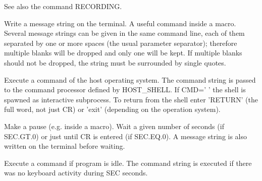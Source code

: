    \par
See also the command RECORDING.  

\ENDCMD


\BEGARG
{}
\ENDARG

   \par
Write a message string on the terminal.  A useful command inside a macro.  
   Several message strings can be given in the same command line, each of them 
   separated by one or more spaces (the usual parameter separator); therefore 
   multiple blanks will be dropped and only one will be kept.  If multiple 
   blanks should not be dropped, the string must be surrounded by single 
   quotes.  

\ENDCMD


\BEGARG
{}
\ENDARG

   \par
Execute a command of the host operating system.  The command string is 
   passed to the command processor defined by HOST\_SHELL.  If CMD=' ' the 
   shell is spawned as interactive subprocess.  To return from the shell enter 
   'RETURN' (the full word, not just \BRA{}CR\KET{}) or 'exit' (depending on 
   the operation system).  

\ENDCMD


\BEGARG
{}
\ENDARG

   \par
Make a pause (e.g. inside a macro).  Wait a given number of seconds (if 
   SEC.GT.0) or just until \BRA{}CR\KET{} is entered (if SEC.EQ.0).  A message 
   string is also written on the terminal before waiting.  

\ENDCMD


\BEGARG
{}
\ENDARG

   \par
Execute a command if program is idle.  The command string is executed if 
   there was no keyboard activity during SEC seconds.  

